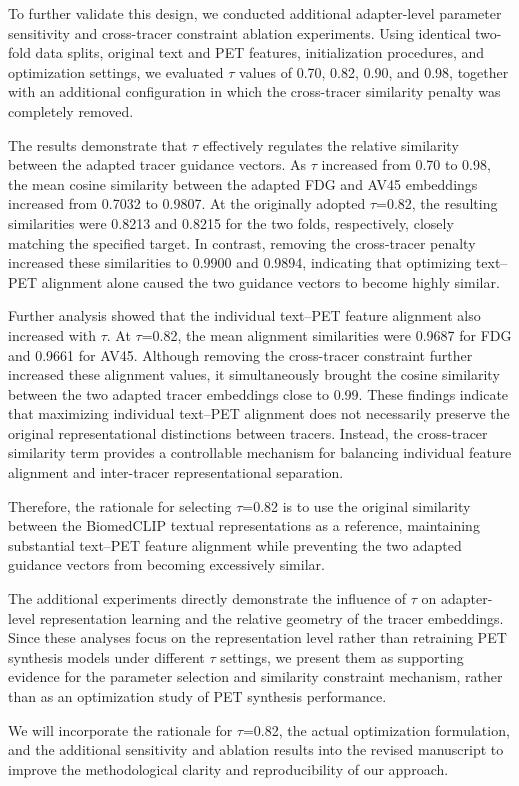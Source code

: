 {To further validate this design, we conducted additional adapter-level parameter sensitivity and cross-tracer constraint ablation experiments. Using identical two-fold data splits, original text and PET features, initialization procedures, and optimization settings, we evaluated $\tau$ values of 0.70, 0.82, 0.90, and 0.98, together with an additional configuration in which the cross-tracer similarity penalty was completely removed.

The results demonstrate that $\tau$ effectively regulates the relative similarity between the adapted tracer guidance vectors. As $\tau$ increased from 0.70 to 0.98, the mean cosine similarity between the adapted FDG and AV45 embeddings increased from 0.7032 to 0.9807. At the originally adopted $\tau$=0.82, the resulting similarities were 0.8213 and 0.8215 for the two folds, respectively, closely matching the specified target. In contrast, removing the cross-tracer penalty increased these similarities to 0.9900 and 0.9894, indicating that optimizing text--PET alignment alone caused the two guidance vectors to become highly similar.

Further analysis showed that the individual text--PET feature alignment also increased with $\tau$. At $\tau$=0.82, the mean alignment similarities were 0.9687 for FDG and 0.9661 for AV45. Although removing the cross-tracer constraint further increased these alignment values, it simultaneously brought the cosine similarity between the two adapted tracer embeddings close to 0.99. These findings indicate that maximizing individual text--PET alignment does not necessarily preserve the original representational distinctions between tracers. Instead, the cross-tracer similarity term provides a controllable mechanism for balancing individual feature alignment and inter-tracer representational separation.

Therefore, the rationale for selecting $\tau$=0.82 is to use the original similarity between the BiomedCLIP textual representations as a reference, maintaining substantial text--PET feature alignment while preventing the two adapted guidance vectors from becoming excessively similar.

The additional experiments directly demonstrate the influence of $\tau$ on adapter-level representation learning and the relative geometry of the tracer embeddings. Since these analyses focus on the representation level rather than retraining PET synthesis models under different $\tau$ settings, we present them as supporting evidence for the parameter selection and similarity constraint mechanism, rather than as an optimization study of PET synthesis performance.

We will incorporate the rationale for $\tau$=0.82, the actual optimization formulation, and the additional sensitivity and ablation results into the revised manuscript to improve the methodological clarity and reproducibility of our approach.
}

